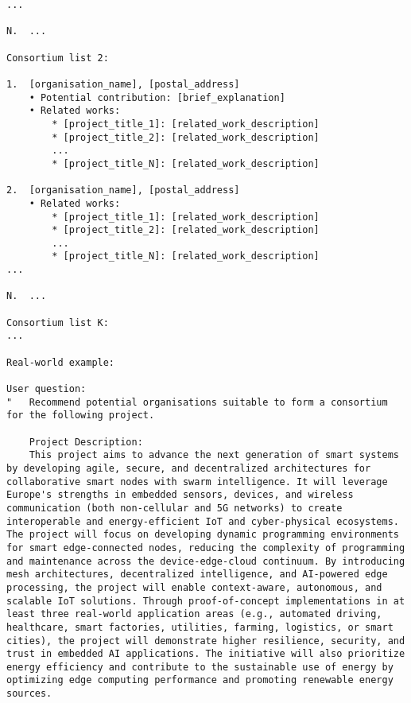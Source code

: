 \begin{lstlisting}
...

N.  ...

Consortium list 2:

1.  [organisation_name], [postal_address]
    • Potential contribution: [brief_explanation]
    • Related works:
        * [project_title_1]: [related_work_description]
        * [project_title_2]: [related_work_description]
        ...
        * [project_title_N]: [related_work_description]
    
2.  [organisation_name], [postal_address]
    • Related works:
        * [project_title_1]: [related_work_description]
        * [project_title_2]: [related_work_description]
        ...
        * [project_title_N]: [related_work_description]
...

N.  ...

Consortium list K:
...

Real-world example:

User question:
"   Recommend potential organisations suitable to form a consortium for the following project.

    Project Description:
    This project aims to advance the next generation of smart systems by developing agile, secure, and decentralized architectures for collaborative smart nodes with swarm intelligence. It will leverage Europe's strengths in embedded sensors, devices, and wireless communication (both non-cellular and 5G networks) to create interoperable and energy-efficient IoT and cyber-physical ecosystems. The project will focus on developing dynamic programming environments for smart edge-connected nodes, reducing the complexity of programming and maintenance across the device-edge-cloud continuum. By introducing mesh architectures, decentralized intelligence, and AI-powered edge processing, the project will enable context-aware, autonomous, and scalable IoT solutions. Through proof-of-concept implementations in at least three real-world application areas (e.g., automated driving, healthcare, smart factories, utilities, farming, logistics, or smart cities), the project will demonstrate higher resilience, security, and trust in embedded AI applications. The initiative will also prioritize energy efficiency and contribute to the sustainable use of energy by optimizing edge computing performance and promoting renewable energy sources.
    

\end{lstlisting}
